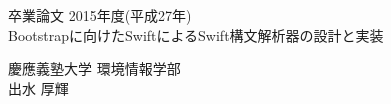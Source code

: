\begin{titlepage}
  \begin{center}
    \begin{large}
      卒業論文   2015年度(平成27年)\\
      \vspace{24pt}
      Bootstrapに向けたSwiftによるSwift構文解析器の設計と実装
      \end{large}
  \end{center}
  \vspace{40em}
  \begin{flushright}
    \large 慶應義塾大学 環境情報学部\\
    出水 厚輝
  \end{flushright}
\end{titlepage}
